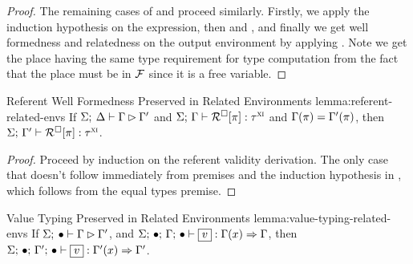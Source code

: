\begin{proof}
  The remaining cases of  and  proceed
  similarly. Firstly, we apply the induction hypothesis on the expression, then
   and
  , and finally we get well formedness and
  relatedness on the output environment by applying
  . Note we get the place having the same
  type requirement for type computation from the fact that the place must be in
  $\mathcal{F}$ since it is a free variable.

\end{proof}

\begin{oxlemma}{Referent Well Formedness Preserved in Related Environments}
  {lemma:referent-related-envs} If
  $\Sigma; \: \Delta \vdash \Gamma \rhd \Gamma^\prime$ and
  $\Sigma; \, \Gamma \vdash \mathcal{R}^\square[\pi] : \tau^\textsc{xi}$
  and $\Gamma(\pi) = \Gamma^\prime(\pi)$, then
  $\Sigma; \, \Gamma^\prime \vdash \mathcal{R}^\square[\pi] : \tau^\textsc{xi}$.
\end{oxlemma}
\begin{proof}
  Proceed by induction on the referent validity derivation. The only case that
  doesn't follow immediately from premises and the induction hypothesis in
  , which follows from the equal types premise.
\end{proof}

\begin{oxlemma}{Value Typing Preserved in Related Environments}
  {lemma:value-typing-related-envs} If
  $\Sigma; \: \bullet \vdash \Gamma \rhd \Gamma^\prime$,
  and $\oxtypjudge{\oxglobalctx}{\oxemptyctx}{\oxemptyctx}{\oxvarctx}{\oxvalue}
  {\oxvarctx(x)}{\oxvarctx}$, then
  $\oxtypjudge{\oxglobalctx}{\oxemptyctx}{\oxemptyctx}{\oxvarctx^\prime}
  {\oxvalue}{\oxvarctx^\prime(x)}{\oxvarctx^\prime}$.
\end{oxlemma}

